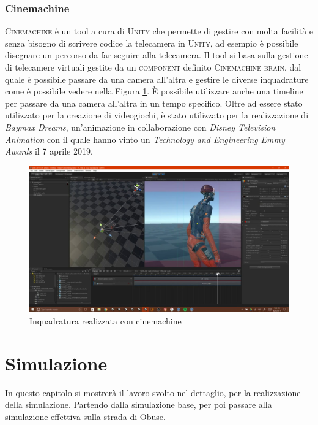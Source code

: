 \documentclass[12pt, openany]{book}
\begin{document}
	\subsection{Cinemachine}
	\textsc{Cinemachine} \cite{Cinemachine} è un tool a cura di \textsc{Unity} che permette di gestire con molta facilità e senza bisogno di scrivere codice la telecamera in \textsc{Unity}, ad esempio è possibile disegnare un percorso da far seguire alla telecamera. Il tool si basa sulla gestione di telecamere virtuali gestite da un \textsc{component} definito \textsc{Cinemachine brain}, dal quale è possibile passare da una camera all'altra e gestire le diverse inquadrature come è possibile vedere nella Figura \ref{fig:CinemachineLogo}. È possibile utilizzare anche una timeline per passare da una camera all'altra in un tempo specifico. Oltre ad essere stato utilizzato per la creazione di videogiochi, è stato utilizzato per la realizzazione di \emph{Baymax Dreams}, un'animazione in collaborazione con \emph{Disney Television Animation} con il quale hanno vinto un \emph{ Technology and Engineering Emmy Awards} il 7 aprile 2019.
		\begin{figure}[H]
		\centering
		\includegraphics[width=1\linewidth]{"Immagini/CinemachineLogo.jpg"}
		\caption{Inquadratura realizzata con cinemachine}
		\label{fig:CinemachineLogo}
	\end{figure}
	
	
	\chapter{Simulazione}
	In questo capitolo si mostrerà il lavoro svolto nel dettaglio, per la realizzazione della simulazione. Partendo dalla simulazione base, per poi passare alla simulazione effettiva sulla strada di Obuse. 
\end{document}
